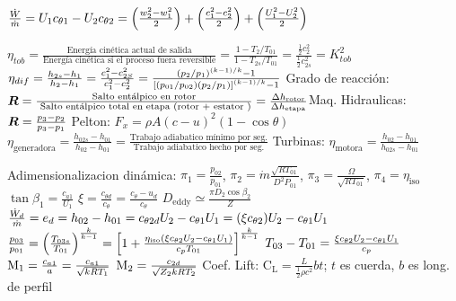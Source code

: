 \formuleoseparator
\begin{formuleo}
$\frac{\dot{W}}{\dot{m}} = U_1 c_{\theta 1} - U_2c_{\theta 2}= \left( \frac{w_2^2-w_1^2}{2} \right)+\left( \frac{c_1^2-c_2^2}{2} \right)+ \left( \frac{U_1^2-U_2^2}{2} \right)$ \separar 

$\eta_{t o b}=\frac{\text {Energía cinética actual de salida}}{\text {Energía cinética si el proceso fuera reversible}} =\frac{1-T_2/T_{01}}{1-T_{2s}/T_{01}}= \frac{\frac{1}{2} c_{2}^{2}}{\frac{1}{2} c_{2 s}^{2}}=K_{t o b}^{2}$ \separar $\eta_{d i f}=\frac{h_{2 s}-h_{1}}{h_{2}-h_{1}}=\frac{c_{1}^{2}-c_{2 S}^{2}}{c_{1}^{2}-c_{2}^{2}}=\frac{(p_2/p_1)^{(k-1)/k}-1}{\left[(p_{01}/p_{02})(p_2/p_1) \right]^{(k-1)/k}-1}$ \separar Grado de reacción: ${\bm{R}}=\frac{\text { Salto entálpico en rotor }}{\text { Salto entálpico total en etapa (rotor }+\text { estator } )} =\frac{\Delta h_{\mathrm{rotor}}}{\Delta h_{\mathrm{etapa}}}$\separar Maq. Hidraulicas: $ {\bm{R}}=\frac{p_{3}-p_{2}}{p_{3}-p_{1}}$ \separar   Pelton: $F_x=\rho A (c-u)^2(1-\cos \theta )$ \separar $\eta_{\mathrm{generadora}}=\frac{h_{02s}-h_{01}}{h_{02}-h_{01}}= \frac{\text{Trabajo adiabatico mínimo por seg.}}{\text{Trabajo adiabatico hecho por seg.}}$ \separar Turbinas: $\eta_{\mathrm{motora}}=\frac{h_{02}-h_{01}}{h_{02s}-h_{01}}$
\end{formuleo}

\formuleoseparator

\begin{formuleo}[Centrifugos] Adimensionalizacion dinámica: $\pi_{1}=\frac{p_{02}}{p_{01}}$, $\pi_{2}=\dot{m} \frac{\sqrt{R T_{01}}}{D^{2} P_{01}}$, $\pi_{3}=\frac{\Omega}{\sqrt{R T_{01}}}$, $\pi_{4}=\eta_{\mathrm{iso}}$\separar$\tan \beta_{1}=\frac{c_{a 1}}{U_{1}}$ \separar $\xi=\frac{c_{\theta d}}{c_{\theta}}=\frac{c_{\theta}-u_{d}}{c_{\theta}}$ \separar $D_{\mathrm{eddy}}\simeq \frac{\pi D_2\cos \beta_2}{Z}$ \separar $\frac{\dot{W}_d}{\dot{m}}=e_d = h_{02}-h_{01}=c_{\theta 2d} U_2 - c_{\theta 1} U_1 = (\xi c_{\theta 2})U_2 - c_{\theta 1} U_1$ 
\separar $\frac{p_{03}}{p_{01}}= \left( \frac{T_{03s}}{T_{01}}\right)^{\frac{k}{k-1}} =\left[ 1+ \frac{\eta_{\mathrm{iso}} (\xi c_{\theta 2}U_2 - c_{\theta 1}U_1)}{{c_p} T_{01}} \right]^{\frac{k}{k-1}}$ \separar $T_{03}-T_{01} = \frac{\xi c_{\theta 2} U_2 - c_{\theta 1}U_1}{c_p}$\separar $\mathrm{M}_1 = \frac{c_{a 1}}{a} = \frac{c_{a 1}}{\sqrt{k R T_1}}$ \separar $\mathrm{M}_2 = \frac{c_{2d}}{\sqrt{Z_2k R T_2}}$ \separar Coef. Lift: $\mathrm{C_L} = \frac{L}{\frac{1}{2} \rho c^2} bt$; $t$ es cuerda, $b$ es long. de perfil 
\end{formuleo}

